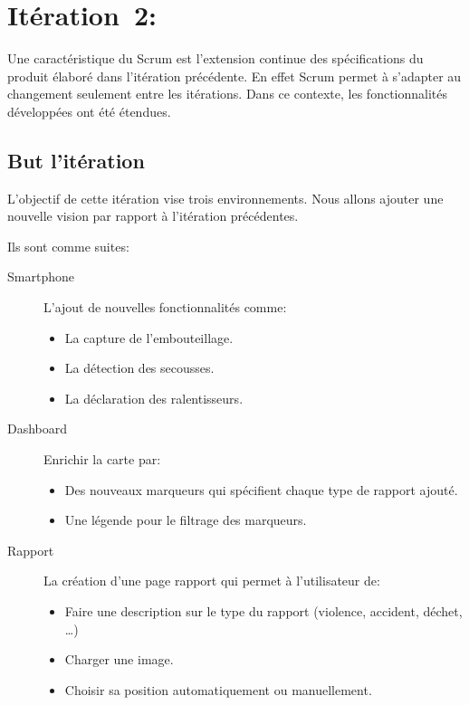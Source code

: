 \chapter[Itération~2:~(~3/8/2017~-~3/28/2017~)]{Itération~2:~\textup{}}


Une caractéristique du Scrum est l'extension continue des spécifications du
produit élaboré dans l'itération précédente. En effet Scrum permet à s'adapter
au changement seulement entre les itérations. Dans ce contexte, les
fonctionnalités développées ont été étendues.

\section{But l'itération}

L'objectif de cette itération vise trois environnements. Nous allons ajouter
une nouvelle vision par rapport à l'itération précédentes.

Ils sont comme suites:

\begin{description}
    \item [Smartphone] L'ajout de nouvelles fonctionnalités comme:
        \begin{itemize}
            \item La capture de l'embouteillage.
            \item La détection des secousses.
            \item La déclaration des ralentisseurs.
        \end{itemize}
    \item [Dashboard] Enrichir la carte par:
        \begin{itemize}
            \item Des nouveaux marqueurs qui spécifient chaque type de rapport
                ajouté.
            \item Une légende pour le filtrage des marqueurs.
        \end{itemize}
    \item [Rapport] La création d'une page rapport qui permet à l'utilisateur
        de:
        \begin{itemize}
            \item Faire une description sur le type du rapport (violence,
                accident, déchet, \ldots)
            \item Charger une image.
            \item Choisir sa position automatiquement ou manuellement.
        \end{itemize}
\end{description}

